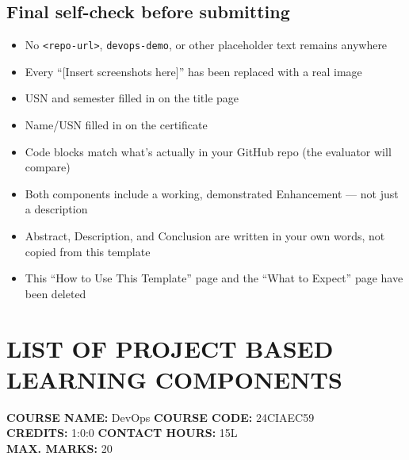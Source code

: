 \documentclass[12pt,a4paper]{article}
\newcommand{\sizeTwelve}{\fontsize{12pt}{14.5pt}\selectfont}  %
\begin{document}
\subsection*{Final self-check before submitting}
\begin{itemize}[nosep]
    \item[$\square$] No \texttt{<repo-url>}, \texttt{devops-demo}, or other placeholder text remains anywhere
    \item[$\square$] Every ``[Insert screenshots here]'' has been replaced with a real image
    \item[$\square$] USN and semester filled in on the title page
    \item[$\square$] Name/USN filled in on the certificate
    \item[$\square$] Code blocks match what's actually in your GitHub repo (the evaluator will compare)
    \item[$\square$] Both components include a working, demonstrated Enhancement --- not just a description
    \item[$\square$] Abstract, Description, and Conclusion are written in your own words, not copied from this template
    \item[$\square$] This ``How to Use This Template'' page and the ``What to Expect'' page have been deleted
\end{itemize}

\newpage

\section*{LIST OF PROJECT BASED LEARNING COMPONENTS}

\noindent
{\sizeTwelve
\textbf{COURSE NAME:} DevOps \hfill \textbf{COURSE CODE:} 24CIAEC59 \\
\textbf{CREDITS:} 1:0:0 \hfill \textbf{CONTACT HOURS:} 15L \\
\textbf{MAX. MARKS:} 20
\par}

\vspace{0.6cm}
\end{document}
